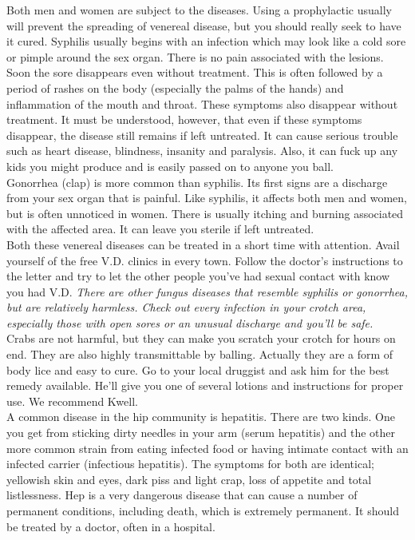 \documentclass[11pt,twoside,a4paper]{book}
\begin{document}
Both men and women are subject to the diseases. Using a prophylactic usually will prevent the spreading of venereal disease, but you should really seek to have it cured. Syphilis usually begins with an infection which may look like a cold sore or pimple around the sex organ. There is no pain associated with the lesions. Soon the sore disappears even without treatment. This is often followed by a period of rashes on the body (especially the palms of the hands) and inflammation of the mouth and throat. These symptoms also disappear without treatment. It must be understood, however, that even if these symptoms disappear, the disease still remains if left untreated. It can cause serious trouble such as heart disease, blindness, insanity and paralysis. Also, it can fuck up any kids you might produce and is easily passed on to anyone you ball.~\\

Gonorrhea (clap) is more common than syphilis. Its first signs are a discharge from your sex organ that is painful. Like syphilis, it affects both men and women, but is often unnoticed in women. There is usually itching and burning associated with the affected area. It can leave you sterile if left untreated.~\\

Both these venereal diseases can be treated in a short time with attention. Avail yourself of the free V.D. clinics in every town. Follow the doctor's instructions to the letter and try to let the other people you've had sexual contact with know you had V.D. \emph{There are other fungus diseases that resemble syphilis or gonorrhea, but are relatively harmless. Check out every infection in your crotch area, especially those with open sores or an unusual discharge and you'll be safe. }~\\

Crabs are not harmful, but they can make you scratch your crotch for hours on end. They are also highly transmittable by balling. Actually they are a form of body lice and easy to cure. Go to your local druggist and ask him for the best remedy available. He'll give you one of several lotions and instructions for proper use. We recommend Kwell.~\\

A common disease in the hip community is hepatitis. There are two kinds. One you get from sticking dirty needles in your arm (serum hepatitis) and the other more common strain from eating infected food or having intimate contact with an infected carrier (infectious hepatitis). The symptoms for both are identical; yellowish skin and eyes, dark piss and light crap, loss of appetite and total listlessness. Hep is a very dangerous disease that can cause a number of permanent conditions, including death, which is extremely permanent. It should be treated by a doctor, often in a hospital.~\\
\end{document}
